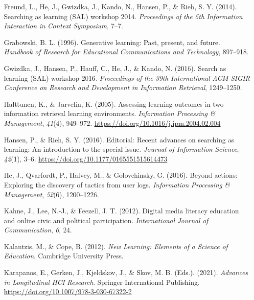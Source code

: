 \documentclass[letterpaper, nobind]{templates/ociamthesis}
\newlength{\cslhangindent}
\newenvironment{CSLReferences}[2] %
 {%
  \setlength{\parindent}{0pt}
  \ifodd #1
  \let\oldpar\par
  \def\par{\hangindent=\cslhangindent\oldpar}
  \fi
  \setlength{\parskip}{1mm}
  \setlength{\baselineskip}{6mm}
 }%
 {}
\begin{document}
\begin{CSLReferences}{1}{0}
\leavevmode{}%
Freund, L., He, J., Gwizdka, J., Kando, N., Hansen, P., \& Rieh, S. Y. (2014). Searching as learning (SAL) workshop 2014. \emph{Proceedings of the 5th Information Interaction in Context Symposium}, 7--7.

\leavevmode{}%
Grabowski, B. L. (1996). Generative learning: Past, present, and future. \emph{Handbook of Research for Educational Communications and Technology}, 897--918.

\leavevmode{}%
Gwizdka, J., Hansen, P., Hauff, C., He, J., \& Kando, N. (2016). Search as learning (SAL) workshop 2016. \emph{Proceedings of the 39th International ACM SIGIR Conference on Research and Development in Information Retrieval}, 1249--1250.

\leavevmode{}%
Halttunen, K., \& Jarvelin, K. (2005). Assessing learning outcomes in two information retrieval learning environments. \emph{Information Processing \& Management}, \emph{41}(4), 949--972. \url{https://doi.org/10.1016/j.ipm.2004.02.004}

\leavevmode{}%
Hansen, P., \& Rieh, S. Y. (2016). Editorial: Recent advances on searching as learning: An introduction to the special issue. \emph{Journal of Information Science}, \emph{42}(1), 3--6. \url{https://doi.org/10.1177/0165551515614473}

\leavevmode{}%
He, J., Qvarfordt, P., Halvey, M., \& Golovchinsky, G. (2016). Beyond actions: Exploring the discovery of tactics from user logs. \emph{Information Processing \& Management}, \emph{52}(6), 1200--1226.

\leavevmode{}%
Kahne, J., Lee, N.-J., \& Feezell, J. T. (2012). Digital media literacy education and online civic and political participation. \emph{International Journal of Communication}, \emph{6}, 24.

\leavevmode{}%
Kalantzis, M., \& Cope, B. (2012). \emph{New {Learning}: Elements of a {Science} of {Education}}. {Cambridge University Press}.

\leavevmode{}%
Karapanos, E., Gerken, J., Kjeldskov, J., \& Skov, M. B. (Eds.). (2021). \emph{Advances in {Longitudinal HCI Research}}. {Springer International Publishing}. \url{https://doi.org/10.1007/978-3-030-67322-2}


\end{CSLReferences}
\end{document}

